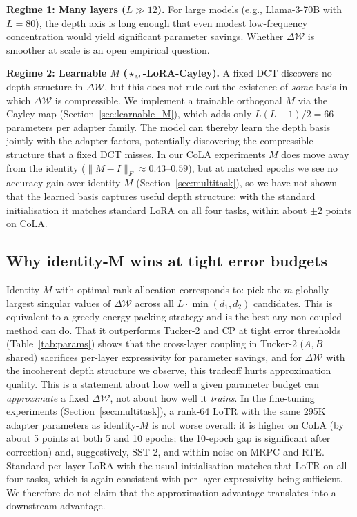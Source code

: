 \documentclass{article}
\newcommand{\DeltaW}{\Delta\mathcal{W}}
\theoremstyle{plain}
\begin{document}
\textbf{Regime 1: Many layers ($L \gg 12$).}
For large models (e.g., Llama-3-70B with $L = 80$), the depth axis is long enough
that even modest low-frequency concentration would yield significant parameter savings.
Whether $\DeltaW$ is smoother at scale is an open empirical question.

\textbf{Regime 2: Learnable $M$ ($\star_M$-LoRA-Cayley).}
A fixed DCT discovers no depth structure in $\DeltaW$, but this does not rule out
the existence of \emph{some} basis in which $\DeltaW$ is compressible.
We implement a trainable orthogonal $M$ via the Cayley map (Section~\ref{sec:learnable_M}),
which adds only $L(L{-}1)/2 = 66$ parameters per adapter family.
The model can thereby learn the depth basis jointly with the adapter factors,
potentially discovering the compressible structure that a fixed DCT misses.
In our CoLA experiments $M$ does move away from the identity ($\|M-I\|_F \approx 0.43$--$0.59$),
but at matched epochs we see no accuracy gain over identity-$M$ (Section~\ref{sec:multitask}),
so we have not shown that the learned basis captures useful depth structure; with the standard initialisation it matches standard LoRA on all four tasks, within about $\pm2$ points on CoLA.

\subsection{Why identity-M wins at tight error budgets}
\label{sec:analysis_identity}

Identity-$M$ with optimal rank allocation corresponds to: pick the $m$ globally
largest singular values of $\DeltaW$ across all $L \cdot \min(d_1,d_2)$ candidates.
This is equivalent to a greedy energy-packing strategy and is the best any
non-coupled method can do.
That it outperforms Tucker-2 and CP at tight error thresholds (Table~\ref{tab:params})
shows that the cross-layer coupling in Tucker-2 ($A, B$ shared) sacrifices
per-layer expressivity for parameter savings, and for $\DeltaW$ with the
incoherent depth structure we observe, this tradeoff hurts approximation quality.
This is a statement about how well a given parameter budget can \emph{approximate} a fixed
$\DeltaW$, not about how well it \emph{trains}.
In the fine-tuning experiments (Section~\ref{sec:multitask}), a rank-64 LoTR with the same
295K adapter parameters as identity-$M$ is not worse overall: it is higher on CoLA (by about 5 points at both 5 and 10 epochs; the
10-epoch gap is significant after correction) and, suggestively, SST-2, and within noise on MRPC and RTE.
Standard per-layer LoRA with the usual initialisation matches that LoTR on all four tasks, which is again consistent with per-layer expressivity being sufficient.
We therefore do not claim that the approximation advantage translates into a downstream advantage.
\end{document}
